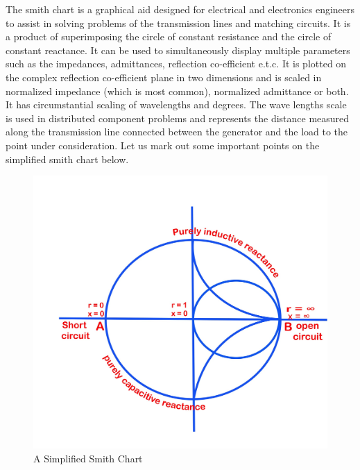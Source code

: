 The smith chart is a graphical aid designed for electrical and electronics engineers to assist in solving problems of the transmission lines and matching circuits. It is a product of superimposing the circle of constant resistance and the circle of constant reactance. It can be used to simultaneously display multiple parameters such as the impedances, admittances, reflection co-efficient e.t.c.
It is plotted on the complex reflection co-efficient plane in two dimensions and is scaled in normalized impedance (which is most common), normalized admittance or both. It has circumstantial scaling of wavelengths and degrees. The wave lengths scale is used in distributed component problems and represents the distance measured along the transmission line connected between the generator and the load to the point under consideration.
Let us mark out some important points on the simplified smith chart below.
\begin{figure}[h]
\centering
\includegraphics[width=0.5\linewidth]{"./graphics/473 drawingjhgfd"}
\caption{A Simplified Smith Chart}
\label{fig:473-drawingjhgfd}
\end{figure}

